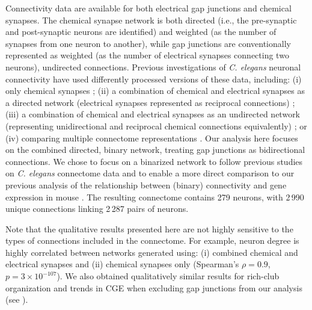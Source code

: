 \documentclass[10pt,letterpaper]{article}
\begin{document}
Connectivity data are available for both electrical gap junctions and chemical synapses.
The chemical synapse network is both directed (i.e., the pre-synaptic and post-synaptic neurons are identified) and weighted (as the number of synapses from one neuron to another), while gap junctions are conventionally represented as weighted (as the number of electrical synapses connecting two neurons), undirected connections.
Previous investigations of \emph{C. elegans} neuronal connectivity have used differently processed versions of these data, including:
(i) only chemical synapses \cite{Kashtan:2004ev};
(ii) a combination of chemical and electrical synapses as a directed network (electrical synapses represented as reciprocal connections) \cite{Azulay:2016cg, Kim:2016gl};
(iii) a combination of chemical and electrical synapses as an undirected network (representing unidirectional and reciprocal chemical connections equivalently) \cite{Towlson2013, Kim:2014bu, Pavlovic:2014gx, van2017guiding};
or (iv) comparing multiple connectome representations \cite{Pan:2010jt}.
Our analysis here focuses on the combined directed, binary network, treating gap junctions as bidirectional connections.
We chose to focus on a binarized network to follow previous studies on \textit{C. elegans} connectome data \cite{Kaufman2006, Towlson2013, Varier2011, Varadan2006, Pavlovic:2014gx} and to enable a more direct comparison to our previous analysis of the relationship between (binary) connectivity and gene expression in mouse \cite{Fulcher:2016ck}.
The resulting connectome contains 279 neurons, with 2\,990 unique connections linking 2\,287 pairs of neurons.

Note that the qualitative results presented here are not highly sensitive to the types of connections included in the connectome.
For example, neuron degree is highly correlated between networks generated using: (i) combined chemical and electrical synapses and (ii) chemical synapses only (Spearman's $\rho= 0.9$, $p = 3 \times 10^{-107}$).
We also obtained qualitatively similar results for rich-club organization and trends in CGE when excluding gap junctions from our analysis (see ).
\end{document}
